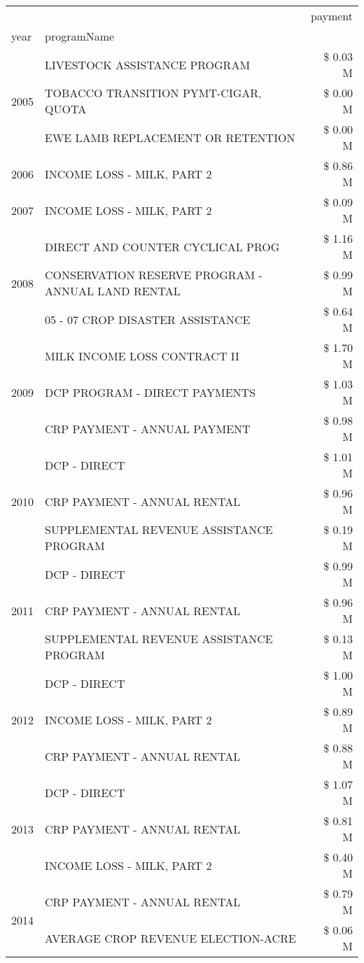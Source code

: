 \begin{tabular}{llr}
\toprule
 &  & payment \\
year & programName &  \\
\midrule
\multirow[t]{3}{*}{2005} & LIVESTOCK ASSISTANCE PROGRAM & \$ 0.03 M \\
 & TOBACCO TRANSITION PYMT-CIGAR, QUOTA & \$ 0.00 M \\
 & EWE LAMB REPLACEMENT OR RETENTION & \$ 0.00 M \\
\cline{1-3}
2006 & INCOME LOSS - MILK, PART 2 & \$ 0.86 M \\
\cline{1-3}
2007 & INCOME LOSS - MILK, PART 2 & \$ 0.09 M \\
\cline{1-3}
\multirow[t]{3}{*}{2008} & DIRECT AND COUNTER CYCLICAL PROG & \$ 1.16 M \\
 & CONSERVATION RESERVE PROGRAM - ANNUAL LAND RENTAL & \$ 0.99 M \\
 & 05 - 07 CROP DISASTER ASSISTANCE & \$ 0.64 M \\
\cline{1-3}
\multirow[t]{3}{*}{2009} & MILK INCOME LOSS CONTRACT II & \$ 1.70 M \\
 & DCP PROGRAM - DIRECT PAYMENTS & \$ 1.03 M \\
 & CRP PAYMENT - ANNUAL PAYMENT & \$ 0.98 M \\
\cline{1-3}
\multirow[t]{3}{*}{2010} & DCP - DIRECT & \$ 1.01 M \\
 & CRP PAYMENT - ANNUAL RENTAL & \$ 0.96 M \\
 & SUPPLEMENTAL REVENUE ASSISTANCE PROGRAM & \$ 0.19 M \\
\cline{1-3}
\multirow[t]{3}{*}{2011} & DCP - DIRECT & \$ 0.99 M \\
 & CRP PAYMENT - ANNUAL RENTAL & \$ 0.96 M \\
 & SUPPLEMENTAL REVENUE ASSISTANCE PROGRAM & \$ 0.13 M \\
\cline{1-3}
\multirow[t]{3}{*}{2012} & DCP - DIRECT & \$ 1.00 M \\
 & INCOME LOSS - MILK, PART 2 & \$ 0.89 M \\
 & CRP PAYMENT - ANNUAL RENTAL & \$ 0.88 M \\
\cline{1-3}
\multirow[t]{3}{*}{2013} & DCP - DIRECT & \$ 1.07 M \\
 & CRP PAYMENT - ANNUAL RENTAL & \$ 0.81 M \\
 & INCOME LOSS - MILK, PART 2 & \$ 0.40 M \\
\cline{1-3}
\multirow[t]{3}{*}{2014} & CRP PAYMENT - ANNUAL RENTAL & \$ 0.79 M \\
 & AVERAGE CROP REVENUE ELECTION-ACRE & \$ 0.06 M \\

\end{tabular}
